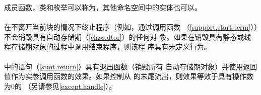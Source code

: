 \begin{example}
  成员函数，类和枚举可以称为，其他命名空间中的实体也可以。
\end{example}

\paragraph{} %
在不离开当前块的情况下终止程序（例如，通过调用函数
（\ref{support.start.term}））不会销毁具有自动存储期（\ref{class.dtor}）的任何对
象。如果在销毁具有静态或线程存储期对象的过程中调用结束程序，则该程
序具有未定义行为。

\paragraph{} %
中的语句（\ref{stmt.return}）具有退出函数（销毁所有
自动存储期对象）并使用返回值作为实参调用函数的效果。如果控制从
的末尾流出，则效果等效于具有操作数为0的
（另请参见\ref{except.handle}）。
